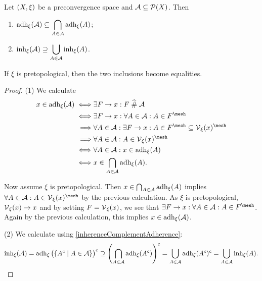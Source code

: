 \begin{proposition}
Let $\sSet{X,\xi}$ be a preconvergence space and $\mathcal{A}\subseteq \operatorname{\mathcal{P}}(X)$. Then
\begin{enumerate}
\item $\displaystyle \operatorname{adh}_\xi(\mathcal{A}) \subseteq \bigcap_{A\in\mathcal{A}}\operatorname{adh}_\xi(A)$;
\item $\displaystyle \operatorname{inh}_\xi(\mathcal{A}) \supseteq \bigcup_{A\in\mathcal{A}}\operatorname{inh}_\xi(A)$.
\end{enumerate}
If $\xi$ is pretopological, then the two inclusions become equalities.
\end{proposition}
\begin{proof}
(1) We calculate
\begin{align*}
x\in\adh_\xi(\mathcal{A}) \iff& \exists F\to x: F\amesh \mathcal{A} \\
\iff& \exists F\to x: \forall A\in\mathcal{A}: A\in F^\mesh \\
\implies& \forall A\in\mathcal{A}: \exists F\to x: A\in F^\mesh \subseteq \vicinities_\xi(x)^\mesh \\
\implies& \forall A\in\mathcal{A}: A\in \vicinities_\xi(x)^\mesh \\
\iff& \forall A\in\mathcal{A}: x\in \adh_\xi(A) \\
\iff& x\in \bigcap_{A\in\mathcal{A}}\adh_\xi(A).
\end{align*}

Now assume $\xi$ is pretopological. Then $x\in \bigcap_{A\in\mathcal{A}}\operatorname{adh}_\xi(A)$ implies $\forall A\in\mathcal{A}: A\in \vicinities_\xi(x)^\mesh$ by the previous calculation. As $\xi$ is pretopological, $\operatorname{\mathcal{V}}_\xi(x) \to x$ and by setting $F = \operatorname{\mathcal{V}}_\xi(x)$, we see that $\exists F\to x: \forall A\in\mathcal{A}: A\in F^\mesh$. Again by the previous calculation, this implies $x\in \operatorname{adh}_\xi(\mathcal{A})$.

(2) We calculate using \ref{inherenceComplementAdherence}:
\[ \inh_\xi(\mathcal{A}) = \adh_\xi\big(\setbuilder{A^c}{A\in \mathcal{A}}\big)^c \supseteq \left(\bigcap_{A\in\mathcal{A}}\adh_{\xi}(A^c)\right)^c = \bigcup_{A\in\mathcal{A}}\adh_{\xi}(A^c)^c = \bigcup_{A\in\mathcal{A}}\inh_{\xi}(A). \]
\end{proof}

